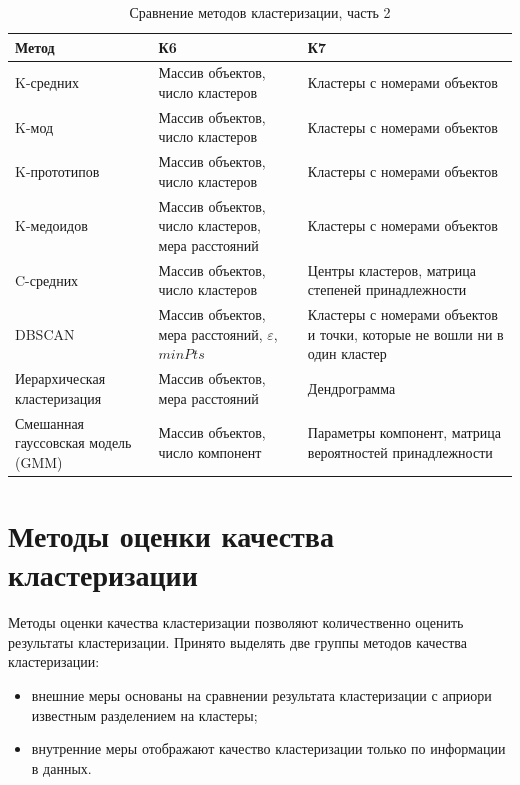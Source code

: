 \begin{table}[H]
	\centering
	\caption{Сравнение методов кластеризации, часть 2}
	\begin{tabular}{|p{4.5cm}|p{5.5cm}|p{5.5cm}|}
		\hline
		\textbf{Метод} & \textbf{К6} & \textbf{К7} \\
		\hline
		K-средних
		& Массив объектов, число кластеров
		& Кластеры с номерами объектов
		\\
		\hline
		K-мод
		& Массив объектов, число кластеров
		& Кластеры с номерами объектов
		\\
		\hline
		K-прототипов
		& Массив объектов, число кластеров
		& Кластеры с номерами объектов
		\\
		\hline
		K-медоидов
		& Массив объектов, число кластеров, мера расстояний
		& Кластеры с номерами объектов
		\\
		\hline
		C-средних
		& Массив объектов, число кластеров
		& Центры кластеров, матрица степеней принадлежности
		\\
		\hline
		DBSCAN
		& Массив объектов, мера расстояний, $\varepsilon$, $minPts$
		& Кластеры с номерами объектов и точки, которые не вошли ни в один кластер
		\\
		\hline
		Иерархическая кластеризация
		& Массив объектов, мера расстояний
		& Дендрограмма
		\\
		\hline
		Смешанная гауссовская модель (GMM)
		& Массив объектов, число компонент
		& Параметры компонент, матрица вероятностей принадлежности
		\\
		\hline
	\end{tabular}
	\label{tbl::clustering_compare_2}
\end{table}



\section{Методы оценки качества кластеризации}

Методы оценки качества кластеризации позволяют количественно оценить результаты кластеризации.
Принято выделять две группы методов качества кластеризации:
\begin{itemize}
	\item[---] внешние меры основаны на сравнении результата кластеризации с априори известным разделением на кластеры;
	\item[---] внутренние меры отображают качество кластеризации только по информации в данных.
\end{itemize}

